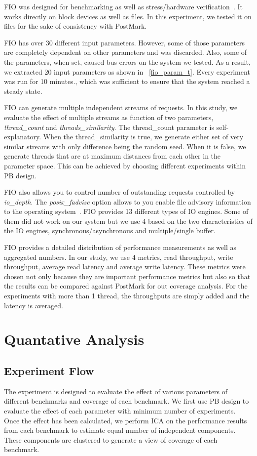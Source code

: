 FIO was designed for benchmarking as well as stress/hardware verification~\cite{axboe:2008}. 
It works directly on block devices as well as files. 
In this experiment, we tested it on files for the sake of consistency with PostMark.

FIO has over 30 different input parameters. 
However, some of those parameters are completely dependent on other parameters and was discarded. 
Also, some of the parameters, when set, caused bus errors on the system we tested. 
As a result, we extracted 20 input parameters as shown in \tablename~\ref{fio_param_t}. 
Every experiment was run for 10 minutes., which was sufficient to ensure that the system reached a steady state. 

FIO can generate multiple independent streams of requests. 
In this study, we evaluate the effect of multiple streams as function of two parameters, \emph{thread\_count} and \emph{threads\_similarity}. 
The thread\_count parameter is self-explanatory. 
When the thread\_similarity is true, we generate either set of very similar streams with only difference being the random seed. 
When it is false, we generate threads that are at maximum distances from each other in the parameter space. 
This can be achieved by choosing different experiments within PB design.

FIO also allows you to control number of outstanding requests controlled by \emph{io\_depth}. 
The \emph{posix\_fadvise} option allows to you enable file advisory information to the operating system~\cite{plonka:2007}. 
FIO provides 13 different types of IO engines. 
Some of them did not work on our system but we use 4 based on the two characteristics of the IO engines, synchronous/asynchronous and multiple/single buffer.

FIO provides a detailed distribution of performance measurements as well as aggregated numbers. 
In our study, we use 4 metrics, read throughput, write throughput, average read latency and average write latency. 
These metrics were chosen not only because they are important performance metrics but also so that the results can be compared against PostMark for out coverage analysis. 
For the experiments with more than 1 thread, the throughputs are simply added and the latency is averaged.

\section{Quantative Analysis}

\subsection{Experiment Flow}
 The experiment is designed to evaluate the effect of various parameters of different benchmarks and coverage of each benchmark. 
We first use PB design to evaluate the effect of each parameter with minimum number of experiments.  
Once the effect has been calculated, we perform ICA on the performance results from each benchmark to estimate equal number of independent components. 
These components are clustered to generate a view of coverage of each benchmark.
 
